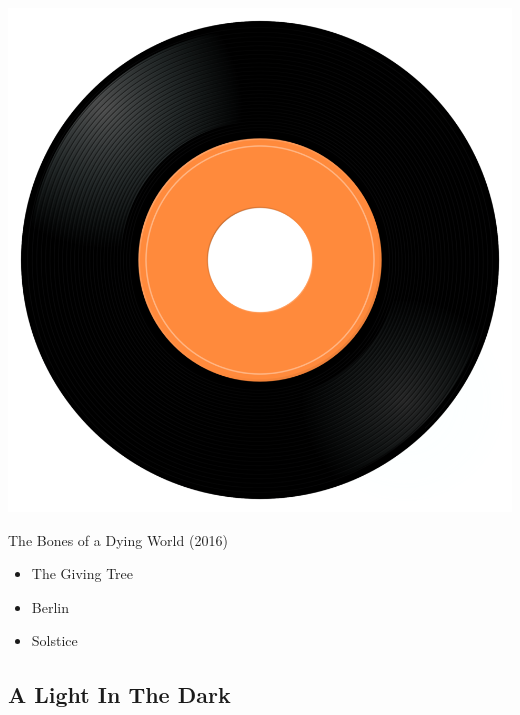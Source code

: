 \begin{minipage}[t]{0.25\textwidth}
\captionsetup{type=figure}
\includegraphics[width=\textwidth]{Images/cover.png}
\caption*{The Bones of a Dying World (2016)}
\end{minipage}
\begin{minipage}[t]{0.25\textwidth}\vspace{0pt}
\begin{itemize}[nosep,leftmargin=1em,labelwidth=*,align=left]
	\setlength{\itemsep}{0pt}
	\item The Giving Tree
	\item Berlin
	\item Solstice
\end{itemize}
\end{minipage}

\subsection{A Light In The Dark}

